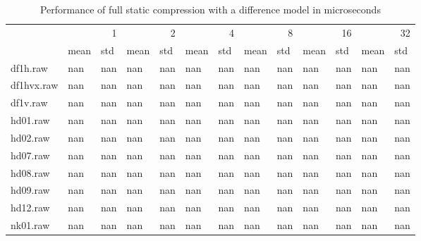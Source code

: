 \begin{table}
\caption{Performance of full static compression with a difference model in microseconds}
\begin{tabular}{lllllllllllll}
 & \multicolumn{2}{r}{1} & \multicolumn{2}{r}{2} & \multicolumn{2}{r}{4} & \multicolumn{2}{r}{8} & \multicolumn{2}{r}{16} & \multicolumn{2}{r}{32} \\
 & mean & std & mean & std & mean & std & mean & std & mean & std & mean & std \\
df1h.raw & nan & nan & nan & nan & nan & nan & nan & nan & nan & nan & nan & nan \\
df1hvx.raw & nan & nan & nan & nan & nan & nan & nan & nan & nan & nan & nan & nan \\
df1v.raw & nan & nan & nan & nan & nan & nan & nan & nan & nan & nan & nan & nan \\
hd01.raw & nan & nan & nan & nan & nan & nan & nan & nan & nan & nan & nan & nan \\
hd02.raw & nan & nan & nan & nan & nan & nan & nan & nan & nan & nan & nan & nan \\
hd07.raw & nan & nan & nan & nan & nan & nan & nan & nan & nan & nan & nan & nan \\
hd08.raw & nan & nan & nan & nan & nan & nan & nan & nan & nan & nan & nan & nan \\
hd09.raw & nan & nan & nan & nan & nan & nan & nan & nan & nan & nan & nan & nan \\
hd12.raw & nan & nan & nan & nan & nan & nan & nan & nan & nan & nan & nan & nan \\
nk01.raw & nan & nan & nan & nan & nan & nan & nan & nan & nan & nan & nan & nan \\
\end{tabular}
\end{table}
